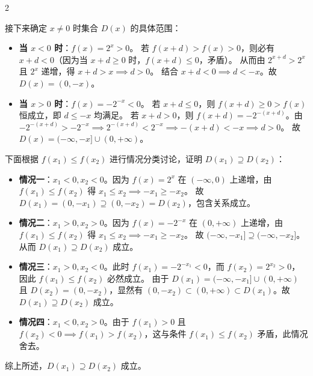\documentclass[11pt,a4paper]{ctexart}
\begin{document}
\begin{paracol}{2}
{\begin{center}
  \end{center}
  接下来确定 $x \neq 0$ 时集合 $D(x)$ 的具体范围：
  \begin{itemize}
    \item \textbf{当 $x < 0$ 时}：$f(x) = 2^x > 0$。
      若 $f(x+d) > f(x) > 0$，则必有 $x+d < 0$（因为当 $x+d \ge 0$ 时，$f(x+d) \le 0$，矛盾）。
      从而由 $2^{x+d} > 2^x$ 且 $2^x$ 递增，得 $x+d > x \implies d > 0$。
      结合 $x+d < 0 \implies d < -x$。故 $D(x) = (0, -x)$。
    \item \textbf{当 $x > 0$ 时}：$f(x) = -2^{-x} < 0$。
      若 $x+d \le 0$，则 $f(x+d) \ge 0 > f(x)$ 恒成立，即 $d \le -x$ 均满足。
      若 $x+d > 0$，则 $f(x+d) = -2^{-(x+d)}$。由 $-2^{-(x+d)} > -2^{-x} \implies 2^{-(x+d)} < 2^{-x} \implies -(x+d) < -x \implies d > 0$。
      故 $D(x) = (-\infty, -x] \cup (0, +\infty)$。
  \end{itemize}
  下面根据 $f(x_1) \le f(x_2)$ 进行情况分类讨论，证明 $D(x_1) \supseteq D(x_2)$：
  \begin{itemize}
    \item \textbf{情况一}：$x_1 < 0, x_2 < 0$。因为 $f(x) = 2^x$ 在 $(-\infty, 0)$ 上递增，由 $f(x_1) \le f(x_2)$ 得 $x_1 \le x_2 \implies -x_1 \ge -x_2$。
      故 $D(x_1) = (0, -x_1) \supseteq (0, -x_2) = D(x_2)$，包含关系成立。
    \item \textbf{情况二}：$x_1 > 0, x_2 > 0$。因为 $f(x) = -2^{-x}$ 在 $(0, +\infty)$ 上递增，由 $f(x_1) \le f(x_2)$ 得 $x_1 \le x_2 \implies -x_1 \ge -x_2$。
      故 $(-\infty, -x_1] \supseteq (-\infty, -x_2]$。从而 $D(x_1) \supseteq D(x_2)$ 成立。
    \item \textbf{情况三}：$x_1 > 0, x_2 < 0$。此时 $f(x_1) = -2^{-x_1} < 0$，而 $f(x_2) = 2^{x_2} > 0$，因此 $f(x_1) \le f(x_2)$ 必然成立。
      由于 $D(x_1) = (-\infty, -x_1] \cup (0, +\infty)$ 且 $D(x_2) = (0, -x_2)$，显然有 $(0, -x_2) \subset (0, +\infty) \subset D(x_1)$。故 $D(x_1) \supseteq D(x_2)$ 成立。
    \item \textbf{情况四}：$x_1 < 0, x_2 > 0$。由于 $f(x_1) > 0$ 且 $f(x_2) < 0 \implies f(x_1) > f(x_2)$，这与条件 $f(x_1) \le f(x_2)$ 矛盾，此情况舍去。
  \end{itemize}
  综上所述，$D(x_1) \supseteq D(x_2)$ 成立。

}
\end{paracol}
\end{document}
